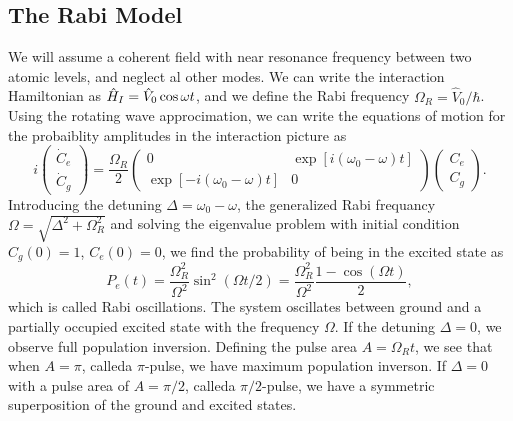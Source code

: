\subsection{The Rabi Model}
We will assume a coherent field with near resonance frequency between two atomic levels, and neglect al other modes. We can write the interaction Hamiltonian as $\hat{H}_I = \hat V_0 \cos\omega t$, and we define the Rabi frequency $\Omega_R =\hat V_0/\hbar$. Using the rotating wave approcimation, we can write the equations of motion for the probaiblity amplitudes in the interaction picture as
\begin{equation}
    i 
    \begin{pmatrix}
        \dot{C}_e\\
        \dot{C}_g
    \end{pmatrix}
    = \frac{\Omega_R}{2}
    \begin{pmatrix}
        0 & \exp[i(\omega_0 -\omega)t]\\
        \exp[-i(\omega_0 -\omega)t] & 0
    \end{pmatrix}
    \begin{pmatrix}
        C_e\\
        C_g
    \end{pmatrix}.
\end{equation}
Introducing the detuning $\Delta = \omega_0 - \omega$, the generalized Rabi frequancy $\Omega = \sqrt{\Delta^2 + \Omega_R^2}$ and solving the eigenvalue problem with initial condition $C_g(0) = 1$, $C_e(0) = 0$, we find the probability of being in the excited state as 
\begin{equation}
    P_e(t) = \frac{\Omega_R^2}{\Omega^2} \sin^2(\Omega t/2) = \frac{\Omega_R^2}{\Omega^2} \frac{1 - \cos(\Omega t)}{2},
\end{equation}
which is called Rabi oscillations. The system oscillates between ground and a partially occupied excited state with the frequency $\Omega$. If the detuning $\Delta = 0$, we observe full population inversion. Defining the pulse area $A = \Omega_R t$, we see that when $A = \pi$, calleda $\pi$-pulse, we have maximum population inverson. If $\Delta = 0$ with a pulse area of $A = \pi/2$, calleda $\pi/2$-pulse, we have a symmetric superposition of the ground and excited states.

